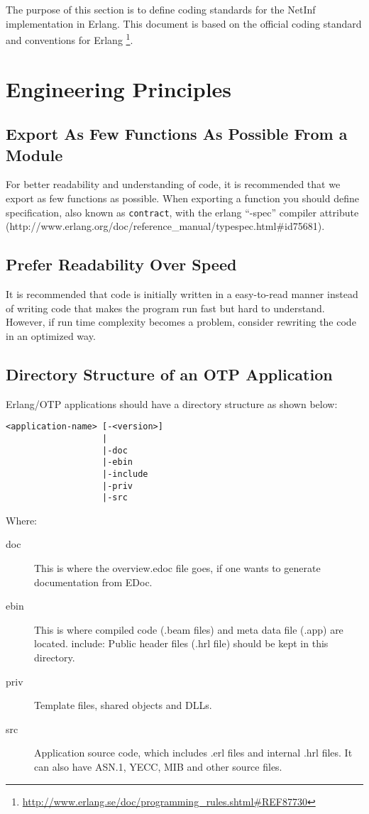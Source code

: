 The purpose of this section is to define coding standards for the NetInf implementation in Erlang. This document is based on the official coding standard and conventions for Erlang \footnote{\url{http://www.erlang.se/doc/programming\_rules.shtml\#REF87730}}. 

\section{Engineering Principles}
\subsection{Export As Few Functions As Possible From a Module}
For better readability and understanding of code, it is recommended that we export as few functions as possible. When exporting a function you should define specification, also known as \texttt{contract}, with the erlang “-spec” compiler attribute (http://www.erlang.org/doc/reference\_manual/typespec.html\#id75681). 

\subsection{Prefer Readability Over Speed}
It is recommended that code is initially written in a easy-to-read manner instead of writing code that makes the program run fast but hard to understand. However, if run time complexity becomes a problem, consider rewriting the code in an optimized way. 

\subsection{Directory Structure of an OTP Application}
Erlang/OTP applications should have a directory structure as shown below:
\begin{lstlisting}	
<application-name> [-<version>]
                   |
                   |-doc
                   |-ebin
                   |-include
                   |-priv
                   |-src
\end{lstlisting}
Where: 
\begin{description}
\item[doc] This is where the overview.edoc file goes, if one wants to generate documentation from EDoc. 
\item[ebin] This is where compiled code (.beam files) and meta data file (.app) are located.
include: Public header files (.hrl file) should be kept in this directory.  
\item[priv] Template files, shared objects and DLLs. 
\item[src] Application source code, which includes .erl files and internal .hrl files. It can also have ASN.1, YECC, MIB and other source files.
\end{description}


